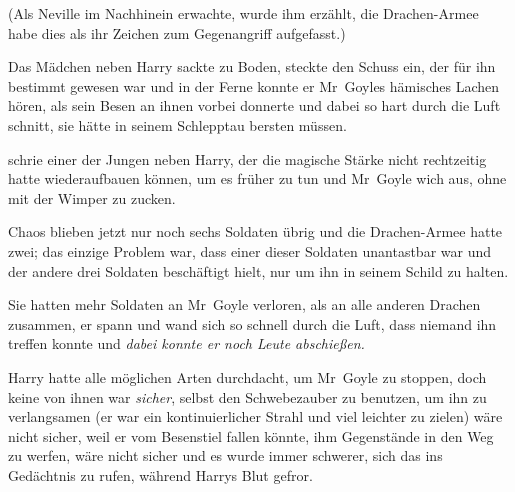 (Als Neville im Nachhinein erwachte, wurde ihm erzählt, die Drachen-Armee habe dies als ihr Zeichen zum Gegenangriff aufgefasst.)

\later

Das Mädchen neben Harry sackte zu Boden, steckte den Schuss ein, der für ihn bestimmt gewesen war und in der Ferne konnte er Mr~Goyles hämisches Lachen hören, als sein Besen an ihnen vorbei donnerte und dabei so hart durch die Luft schnitt, sie hätte in seinem Schlepptau bersten müssen.

 schrie einer der Jungen neben Harry, der die magische Stärke nicht rechtzeitig hatte wiederaufbauen können, um es früher zu tun und Mr~Goyle wich aus, ohne mit der Wimper zu zucken.

Chaos blieben jetzt nur noch sechs Soldaten übrig und die Drachen-Armee hatte zwei; das einzige Problem war, dass einer dieser Soldaten unantastbar war und der andere drei Soldaten beschäftigt hielt, nur um ihn in seinem Schild zu halten.

Sie hatten mehr Soldaten an Mr~Goyle verloren, als an alle anderen Drachen zusammen, er spann und wand sich so schnell durch die Luft, dass niemand ihn treffen konnte und \emph{dabei konnte er noch Leute abschießen.}

Harry hatte alle möglichen Arten durchdacht, um Mr~Goyle zu stoppen, doch keine von ihnen war \emph{sicher}, selbst den Schwebezauber zu benutzen, um ihn zu verlangsamen (er war ein kontinuierlicher Strahl und viel leichter zu zielen) wäre nicht sicher, weil er vom Besenstiel fallen könnte, ihm Gegenstände in den Weg zu werfen, wäre nicht sicher und es wurde immer schwerer, sich das ins Gedächtnis zu rufen, während Harrys Blut gefror.

